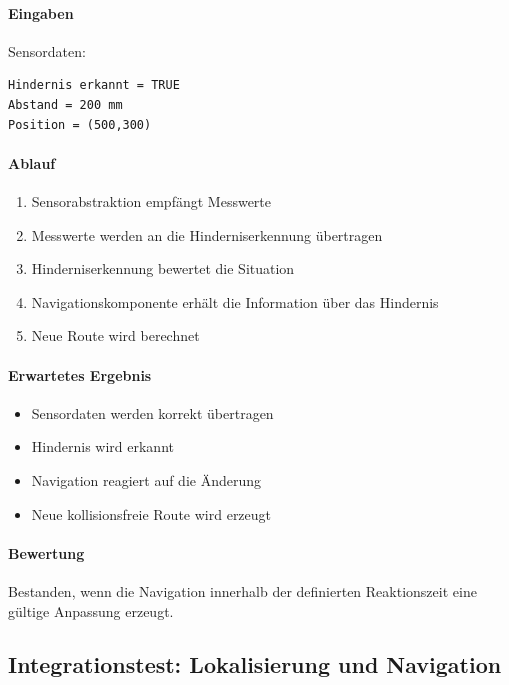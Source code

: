\paragraph{Eingaben}\label{eingaben-9}

Sensordaten:

\begin{verbatim}
Hindernis erkannt = TRUE
Abstand = 200 mm
Position = (500,300)
\end{verbatim}

\paragraph{Ablauf}\label{ablauf-9}

\begin{enumerate}
\def\labelenumi{\arabic{enumi}.}
\tightlist
\item
  Sensorabstraktion empfängt Messwerte
\item
  Messwerte werden an die Hinderniserkennung übertragen
\item
  Hinderniserkennung bewertet die Situation
\item
  Navigationskomponente erhält die Information über das Hindernis
\item
  Neue Route wird berechnet
\end{enumerate}

\paragraph{Erwartetes Ergebnis}\label{erwartetes-ergebnis-9}

\begin{itemize}
\tightlist
\item
  Sensordaten werden korrekt übertragen
\item
  Hindernis wird erkannt
\item
  Navigation reagiert auf die Änderung
\item
  Neue kollisionsfreie Route wird erzeugt
\end{itemize}

\paragraph{Bewertung}\label{bewertung-9}

Bestanden, wenn die Navigation innerhalb der definierten Reaktionszeit
eine gültige Anpassung erzeugt.

\subsection{Integrationstest: Lokalisierung und
Navigation}\label{integrationstest-lokalisierung-und-navigation}

